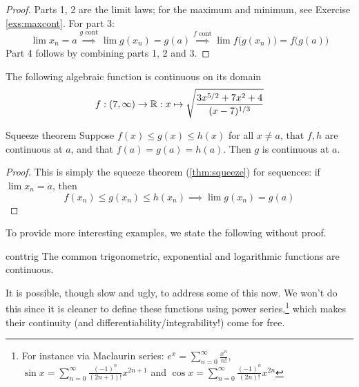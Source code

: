 \begin{proof}
	Parts 1, 2 are the limit laws; for the maximum and minimum, see Exercise \ref{exs:maxcont}. For part 3:
	\[
		\lim x_n=a\overset{g\text{ cont}}
		\implies \lim g(x_n)=g(a)
		\overset{f\text{ cont}}\implies
		\lim f\bigl(g(x_n)\bigr)
		=f\bigl(g(a)\bigr)
	\]
	Part 4 follows by combining parts 1, 2 and 3. 
\end{proof}


\begin{example}{}{}
	The following algebraic function is continuous on its domain
	\[
		f:(7,\infty)\to\mathbb{R}:x\mapsto \sqrt{\frac{3x^{5/2}+7x^2+4}{(x-7)^{1/3}}}
	\]
\end{example}


\goodbreak


\begin{thm}{Squeeze theorem}{}
	Suppose $f(x)\le g(x)\le h(x)$ for all $x\neq a$, that $f,h$ are continuous at $a$, and that $f(a)=g(a)=h(a)$. Then $g$ is continuous at $a$. 
\end{thm}

\begin{proof}
	This is simply the squeeze theorem (\ref{thm:squeeze}) for sequences: if $\lim x_n=a$, then
	\[
		f(x_n)\le g(x_n)\le h(x_n)\implies \lim g(x_n)=g(a)\tag*{\qedhere}
	\]
\end{proof}

To provide more interesting examples, we state the following without proof.

\begin{thm}{}{conttrig}
	The common trigonometric, exponential and logarithmic functions are continuous.
\end{thm}

It is possible, though slow and ugly, to address some of this now. We won't do this since it is cleaner to define these functions using power series,\footnote{%
	For instance via Maclaurin series: $e^x=\sum\limits_{n=0}^\infty\frac{x^n}{n!}$, \ $\sin x=\sum\limits_{n=0}^\infty\frac{(-1)^n}{(2n+1)!}x^{2n+1}$ and $\cos x=\sum\limits_{n=0}^\infty\frac{(-1)^n}{(2n)!}x^{2n}$%
}
which makes their continuity (and differentiability/integrability!) come for free.



